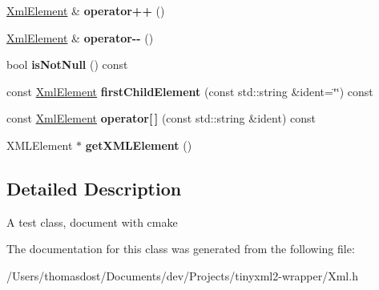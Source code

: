 \begin{DoxyCompactItemize}
\hyperlink{classeng_1_1_xml_element}{Xml\+Element} \& {\bfseries operator++} ()
\item 
\mbox{\label{classeng_1_1_xml_element_a11472f3e2b4f8226058a5fcba89c2d2a}} 
\hyperlink{classeng_1_1_xml_element}{Xml\+Element} \& {\bfseries operator-\/-\/} ()
\item 
\mbox{\label{classeng_1_1_xml_element_aa6f71f5cae1976653f4067e309b7b3c9}} 
bool {\bfseries is\+Not\+Null} () const
\item 
\mbox{\label{classeng_1_1_xml_element_a6ececbdcfa0444e3aef10254c9641548}} 
const \hyperlink{classeng_1_1_xml_element}{Xml\+Element} {\bfseries first\+Child\+Element} (const std\+::string \&ident=\char`\"{}\char`\"{}) const
\item 
\mbox{\label{classeng_1_1_xml_element_a0a4dd16cf856257a33679c666d0b3377}} 
const \hyperlink{classeng_1_1_xml_element}{Xml\+Element} {\bfseries operator\mbox{[}$\,$\mbox{]}} (const std\+::string \&ident) const
\item 
\mbox{\label{classeng_1_1_xml_element_ac98ea12a51dc393cab79de57ad1b3424}} 
X\+M\+L\+Element $\ast$ {\bfseries get\+X\+M\+L\+Element} ()
\end{DoxyCompactItemize}


\subsection{Detailed Description}
A test class, document with cmake 

The documentation for this class was generated from the following file\+:\begin{DoxyCompactItemize}
\item 
/\+Users/thomasdost/\+Documents/dev/\+Projects/tinyxml2-\/wrapper/Xml.\+h\end{DoxyCompactItemize}

